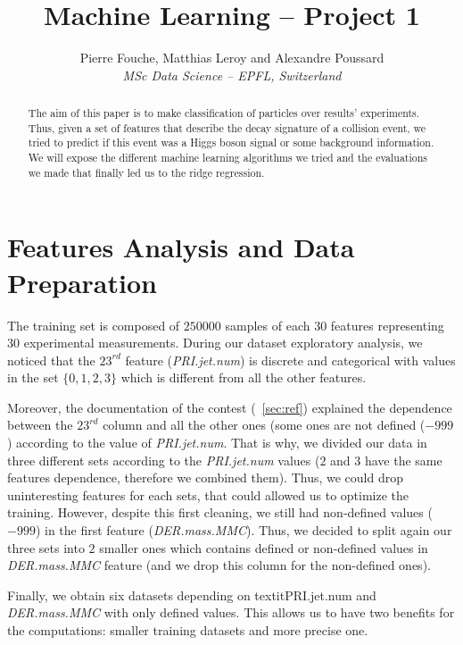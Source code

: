 \documentclass[10pt,conference,compsocconf]{IEEEtran}
\begin{document}
\title{Machine Learning -- Project 1}

\author{
  Pierre Fouche, Matthias Leroy and Alexandre Poussard\\
  \textit{MSc Data Science -- EPFL, Switzerland}
}

\maketitle

\begin{abstract}
  The aim of this paper is to make classification of particles over results' experiments. Thus, given a set of features that describe the decay signature of a collision event, we tried to predict if this event was a Higgs boson signal or some background information. We will expose the different machine learning algorithms we tried and the evaluations we made that finally led us to the ridge regression.
\end{abstract}

\section{Features Analysis and Data Preparation}

The training set is composed of $250 000$ samples of each $30$ features representing $30$ experimental measurements. During our dataset exploratory analysis, we noticed that the $23^{rd}$ feature (\textit{PRI.jet.num}) is discrete and categorical with values in the set $\{0,1,2,3\}$ which is different from all the other features. 

Moreover, the documentation of the contest (~\ref{sec:ref}) explained the dependence between the $23^{rd}$ column and all the other ones (some ones are not defined ($-999$) according to the value of \textit{PRI.jet.num}. That is why, we divided our data in three different sets according to the \textit{PRI.jet.num} values ($2$ and $3$ have the same features dependence, therefore we combined them). Thus, we could drop uninteresting features for each sets, that could allowed us to optimize the training. However, despite this first cleaning, we still had non-defined values ($-999$) in the first feature (\textit{DER.mass.MMC}). Thus, we decided to split again our three sets into $2$ smaller ones which contains defined or non-defined values in \textit{DER.mass.MMC} feature (and we drop this column for the non-defined ones).

Finally, we obtain six datasets depending on textit{PRI.jet.num} and \textit{DER.mass.MMC} with only defined values. This allows us to have two benefits for the computations: smaller training datasets and more precise one. 
\end{document}
